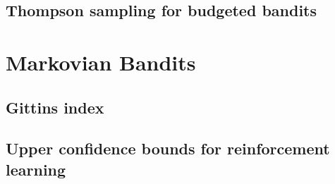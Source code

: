 \documentclass[10pt,a4article]{article}
\numberwithin{equation}{section}
\theoremstyle{plain}
\theoremstyle{definition}
\begin{document}
\subsection{Thompson sampling for budgeted bandits}


\newpage
 
\section{Markovian Bandits}

\subsection{Gittins index}

\subsection{Upper confidence bounds for reinforcement learning}



 

\newpage

\printbibliography

 
 
\end{document}
